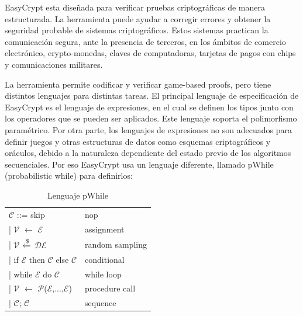 \documentclass[runningheads]{llncs}
\begin{document}
EasyCrypt esta diseñada para verificar pruebas criptográficas de manera estructurada. La herramienta puede ayudar a corregir errores y obtener la seguridad probable de sistemas criptográficos. Estos sistemas practican la comunicación segura, ante la presencia de terceros, en los ámbitos de comercio electrónico, crypto-monedas, claves de computadoras, tarjetas de pagos con chips y comunicaciones militares.

La herramienta permite codificar y verificar game-based proofs, pero tiene distintos lenguajes para distintas tareas. El principal lenguaje de especificación de EasyCrypt es el lenguaje de expresiones, en el cual se definen los tipos junto con los operadores que se pueden ser aplicados. Este lenguaje soporta el polimorfismo paramétrico. Por otra parte, los lenguajes de expresiones no son adecuados para definir juegos y otras estructuras de datos como esquemas criptográficos y oráculos, debido a la naturaleza dependiente del estado previo de los algoritmos secuenciales. Por eso EasyCrypt usa un lenguaje diferente, llamado pWhile\cite{ref_book1} (probabilistic while) para definirlos:

\begin{table}[H]
  \setlength{\tabcolsep}{12pt}
  \caption{Lenguaje pWhile}
  \label{tab:simple}
  \centering
  \begin{tabular}{ll}
    \toprule
    $\mathcal{C}$ ::= skip & nop\\
    \hspace{0.5cm}| $\mathcal{V}$	$\xleftarrow{}$ $\mathcal{E}$ & assignment\\
    \hspace{0.5cm}| $\mathcal{V}$ $\xleftarrow{\text{\textdollar}}$ $\mathcal{D}$$\mathcal{E}$ & random sampling\\
    \hspace{0.5cm}| if $\mathcal{E}$ then $\mathcal{C}$ else $\mathcal{C}$ & conditional\\
    \hspace{0.5cm}| while $\mathcal{E}$ do $\mathcal{C}$ & while loop\\
    \hspace{0.5cm}| $\mathcal{V}$	$\xleftarrow{}$ $\mathcal{P}$($\mathcal{E}$,...,$\mathcal{E}$) & procedure call\\
    \hspace{0.5cm}| $\mathcal{C}$; $\mathcal{C}$ & sequence\\
    \bottomrule
  \end{tabular}
\end{table}
\end{document}
